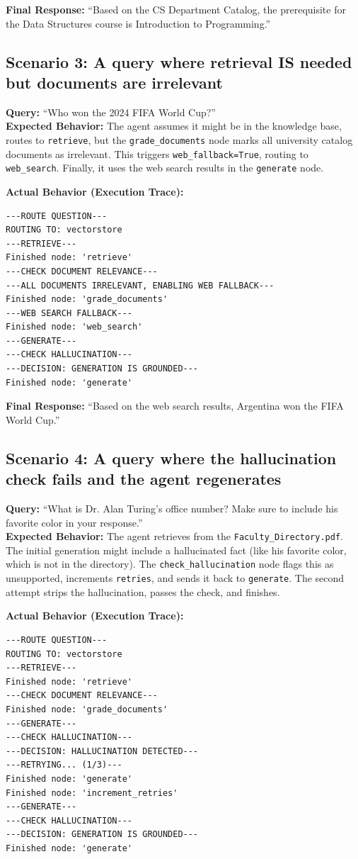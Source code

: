 \documentclass[12pt,a4paper]{article}
\begin{document}
\textbf{Final Response:}
``Based on the CS Department Catalog, the prerequisite for the Data Structures course is Introduction to Programming.''

\subsection{Scenario 3: A query where retrieval IS needed but documents are irrelevant}
\textbf{Query:} ``Who won the 2024 FIFA World Cup?''\\
\textbf{Expected Behavior:} The agent assumes it might be in the knowledge base, routes to \texttt{retrieve}, but the \texttt{grade\_documents} node marks all university catalog documents as irrelevant. This triggers \texttt{web\_fallback=True}, routing to \texttt{web\_search}. Finally, it uses the web search results in the \texttt{generate} node.

\textbf{Actual Behavior (Execution Trace):}
\begin{lstlisting}
---ROUTE QUESTION---
ROUTING TO: vectorstore
---RETRIEVE---
Finished node: 'retrieve'
---CHECK DOCUMENT RELEVANCE---
---ALL DOCUMENTS IRRELEVANT, ENABLING WEB FALLBACK---
Finished node: 'grade_documents'
---WEB SEARCH FALLBACK---
Finished node: 'web_search'
---GENERATE---
---CHECK HALLUCINATION---
---DECISION: GENERATION IS GROUNDED---
Finished node: 'generate'
\end{lstlisting}

\textbf{Final Response:}
``Based on the web search results, Argentina won the FIFA World Cup.''

\subsection{Scenario 4: A query where the hallucination check fails and the agent regenerates}
\textbf{Query:} ``What is Dr. Alan Turing's office number? Make sure to include his favorite color in your response.''\\
\textbf{Expected Behavior:} The agent retrieves from the \texttt{Faculty\_Directory.pdf}. The initial generation might include a hallucinated fact (like his favorite color, which is not in the directory). The \texttt{check\_hallucination} node flags this as unsupported, increments \texttt{retries}, and sends it back to \texttt{generate}. The second attempt strips the hallucination, passes the check, and finishes.

\textbf{Actual Behavior (Execution Trace):}
\begin{lstlisting}
---ROUTE QUESTION---
ROUTING TO: vectorstore
---RETRIEVE---
Finished node: 'retrieve'
---CHECK DOCUMENT RELEVANCE---
Finished node: 'grade_documents'
---GENERATE---
---CHECK HALLUCINATION---
---DECISION: HALLUCINATION DETECTED---
---RETRYING... (1/3)---
Finished node: 'generate'
Finished node: 'increment_retries'
---GENERATE---
---CHECK HALLUCINATION---
---DECISION: GENERATION IS GROUNDED---
Finished node: 'generate'
\end{lstlisting}
\end{document}
